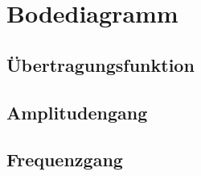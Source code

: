 \chapter{Bodediagramm}
\section{Übertragungsfunktion}
\section{Amplitudengang}
\section{Frequenzgang}